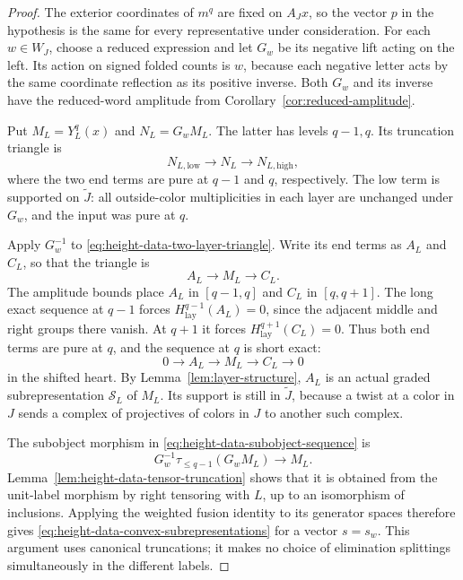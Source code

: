 \begin{proof}
The exterior coordinates of $m^q$ are fixed on $A_Jx$,
so the vector $p$ in the hypothesis is the same for
every representative under consideration.  For each
$w\in W_J$, choose a reduced expression and let $G_w$
be its negative lift acting on the left.  Its action
on signed folded counts is $w$, because each negative
letter acts by the same coordinate reflection as its
positive inverse.  Both $G_w$ and its inverse have
the reduced-word amplitude from
Corollary~\ref{cor:reduced-amplitude}.

Put $M_L=Y_L^q(x)$ and $N_L=G_wM_L$.  The latter has
levels $q-1,q$.  Its truncation triangle is
\begin{equation}
 N_{L,\mathrm{low}}\longrightarrow N_L
       \longrightarrow N_{L,\mathrm{high}},
 \label{eq:height-data-two-layer-triangle}
\end{equation}
where the two end terms are pure at $q-1$ and $q$,
respectively.  The low term is supported on
$\widetilde J$: all outside-color multiplicities in
each layer are unchanged under $G_w$, and the input
was pure at $q$.

Apply $G_w^{-1}$ to
\eqref{eq:height-data-two-layer-triangle}.  Write its
end terms as $A_L$ and $C_L$, so that the triangle is
\[
 A_L\longrightarrow M_L\longrightarrow C_L.
\]
The amplitude bounds place $A_L$ in $[q-1,q]$ and
$C_L$ in $[q,q+1]$.  The long exact sequence at $q-1$
forces $H^{q-1}_{\mathrm{lay}}(A_L)=0$, since the
adjacent middle and right groups there vanish.  At
$q+1$ it forces
$H^{q+1}_{\mathrm{lay}}(C_L)=0$.  Thus both end terms
are pure at $q$, and the sequence at $q$ is short
exact:
\begin{equation}
 0\longrightarrow A_L\longrightarrow M_L
       \longrightarrow C_L\longrightarrow0
 \label{eq:height-data-subobject-sequence}
\end{equation}
in the shifted heart.  By
Lemma~\ref{lem:layer-structure}, $A_L$ is an actual
graded subrepresentation $\mathcal S_L$ of $M_L$.
Its support is still in $\widetilde J$, because a
twist at a color in $J$ sends a complex of projectives
of colors in $J$ to another such complex.

The subobject morphism in
\eqref{eq:height-data-subobject-sequence} is
\[
 G_w^{-1}\tau_{\leq q-1}(G_wM_L)
       \longrightarrow M_L.
\]
Lemma~\ref{lem:height-data-tensor-truncation} shows
that it is obtained from the unit-label morphism by
right tensoring with $L$, up to an isomorphism of
inclusions.  Applying the weighted fusion identity to
its generator spaces therefore gives
\eqref{eq:height-data-convex-subrepresentations} for
a vector $s=s_w$.  This argument uses canonical
truncations; it makes no choice of elimination
splittings simultaneously in the different labels.


\end{proof}
